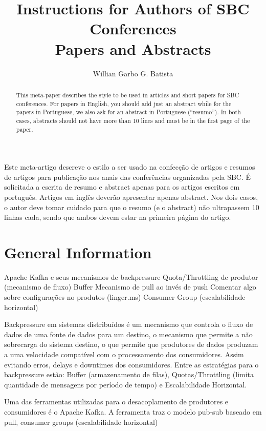 \documentclass[12pt]{article}
\title{Instructions for Authors of SBC Conferences\\ Papers and Abstracts}
\author{Willian Garbo G. Batista\inst{1}}
\begin{document}
 

\maketitle

\begin{abstract}
  This meta-paper describes the style to be used in articles and short papers
  for SBC conferences. For papers in English, you should add just an abstract
  while for the papers in Portuguese, we also ask for an abstract in
  Portuguese (``resumo''). In both cases, abstracts should not have more than
  10 lines and must be in the first page of the paper.
\end{abstract}
     
\begin{resumo} 
  Este meta-artigo descreve o estilo a ser usado na confecção de artigos e
  resumos de artigos para publicação nos anais das conferências organizadas
  pela SBC. É solicitada a escrita de resumo e abstract apenas para os artigos
  escritos em português. Artigos em inglês deverão apresentar apenas abstract.
  Nos dois casos, o autor deve tomar cuidado para que o resumo (e o abstract)
  não ultrapassem 10 linhas cada, sendo que ambos devem estar na primeira
  página do artigo.
\end{resumo}


\section{General Information}

Apache Kafka e seus mecanismos de backpressure
Quota/Throttling de produtor (mecanismo de fluxo)
Buffer
Mecanismo de pull ao invés de push
Comentar algo sobre configurações no produtos (linger.ms)
Consumer Group (escalabilidade horizontal)

Backpressure em sistemas distribuídos é um mecanismo que controla o fluxo de dados de uma fonte de dados para um destino, o mecanismo que permite a não sobrecarga do sistema destino, o que permite que produtores de dados produzam a uma velocidade compatível com o processamento dos consumidores. Assim evitando erros, delays e downtimes dos consumidores. Entre as estratégias para o backpressure estão: Buffer (armazenamento de filas), Quotas/Throttling (limita quantidade de mensagens por período de tempo) e Escalabilidade Horizontal.

Uma das ferramentas utilizadas para o desacoplamento de produtores e consumidores é o Apache Kafka. A ferramenta traz o modelo pub-sub baseado em pull, consumer groups (escalabilidade horizontal)
\end{document}
